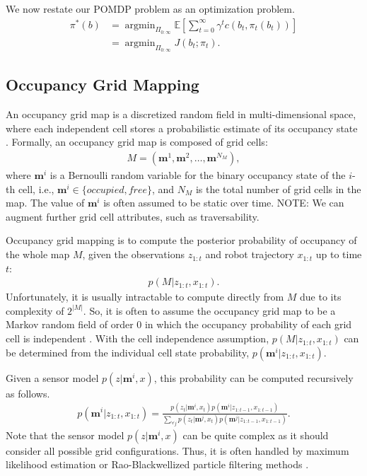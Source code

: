 \documentclass[letterpaper, 10 pt, conference]{ieeeconf}  %
\newcommand{\note}[1]{{\color{cyan} NOTE: #1 }}
\newcommand{\argmin}{\mathop{\mathrm{argmin}}}
\begin{document}
We now restate our POMDP problem as an optimization problem.
\begin{align}
  \pi^*(b) & = \argmin_{\Pi_{0:\infty}} \mathbb{E} \left[ \sum_{t=0}^\infty \gamma^t c(b_t, \pi_t(b_t)) \right]
  \nonumber \\ 
  &  = \argmin_{\Pi_{0:\infty}} J(b_t; \pi_t).
  \label{eq:pomdpopt}
\end{align}


\subsection{Occupancy Grid Mapping}

An occupancy grid map is a discretized random field in multi-dimensional space, where each independent cell stores a probabilistic estimate of its occupancy state \cite{moravec1985high,elfes1990stochastic}.
%
Formally, an occupancy grid map is composed of grid cells:
\begin{align}
  M = (\mathbf{m}^1, \mathbf{m}^2, \dots, \mathbf{m}^{N_M}),
\end{align}
where $\mathbf{m}^i$ is a Bernoulli random variable for the binary occupancy state of the $i$-th cell,
i.e., $\mathbf{m}^i \in \{occupied, free\}$, and
$N_M$ is the total number of grid cells in the map.
The value of $\mathbf{m}^i$ is often assumed to be static over time.
\note{We can augment further grid cell attributes, such as traversability.}

Occupancy grid mapping is to compute the posterior probability of occupancy of the whole map $M$, given the observations $z_{1:t}$ and robot trajectory $x_{1:t}$ up to time $t$:
\begin{align}
  p(M | z_{1:t}, x_{1:t}).
\end{align}
Unfortunately, it is usually intractable to compute directly from $M$ due to its complexity of $2^{|M|}$.
So, it is often to assume the occupancy grid map to be a Markov random field of order 0 in which the occupancy probability of each grid cell is independent \cite{TBF05,elfes1990stochastic}.
With the cell independence assumption, $p(M | z_{1:t}, x_{1:t})$ can be determined from the individual cell state probability, $p(\mathbf{m}^i | z_{1:t}, x_{1:t})$.

Given a sensor model $p(z | \mathbf{m}^i, x)$, this probability can be computed recursively as follows.
\begin{align}
  p(\mathbf{m}^i | z_{1:t}, x_{1:t}) =
  \frac{p(z_t | \mathbf{m}^i, x_{t}) p(\mathbf{m}^i | z_{1:t-1}, x_{1:t-1})}
       {\sum_{\forall j} p(z_t | \mathbf{m}^j, x_{t}) p(\mathbf{m}^j | z_{1:t-1}, x_{1:t-1})}.
\end{align}
Note that the sensor model $p(z | \mathbf{m}^i, x)$ can be quite complex as it should consider all possible grid configurations.
Thus, it is often handled by maximum likelihood estimation or Rao-Blackwellized particle filtering methods \cite{burgard2005coordinated,stachniss2005information}.
\end{document}
